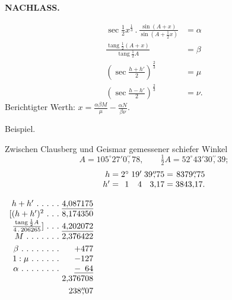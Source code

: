 \par\clearpage
\noindent{}\hfill{\small\textbf{NACHLASS.}}\hfill\null\par\medskip
\[
\begin{aligned}
\sec\tfrac12x^{\frac13}\,.\,\frac{\sin(A+x)}{\sin(A+\frac12x)}&=\alpha\\[4pt]
\frac{\operatorname{tang}\frac12(A+x)}{\operatorname{tang}\frac12A}&=\beta\\[4pt]
\left(\sec\frac{h+h'}2\right)^{\frac23}&=\mu\\[4pt]
\left(\sec\frac{h-h'}2\right)^{\frac23}&=\nu.
\end{aligned}
\]
\noindent Berichtigter Werth: $\displaystyle x=\frac{\alpha\beta M}{\mu}-\frac{\alpha N}{\beta\nu}$.
\begin{center}Beispiel.\end{center}
\noindent Zwischen Clausberg und Geismar gemessener schiefer Winkel
\[
A=105^\circ27'0\overset{\prime\prime}{,}78,\qquad
\tfrac12A=52^\circ43'30\overset{\prime\prime}{,}39;
\]
\[
\begin{array}{r@{\;}c@{\;}r@{\;}r@{\;}r@{\;}c@{\;}r}
h&=&2^\circ&19'&39\overset{\prime\prime}{,}75&=&8379\overset{\prime\prime}{,}75\\
h'&=&1&4&3{,}17&=&3843{,}17.
\end{array}
\]
\noindent\begin{minipage}[t]{.31\linewidth}\centering
$\begin{array}{r@{\ }r}
h+h'\ .\ .\ .\ .\ .&\underline{4{,}087175}\\
{[}(h+h')^2\ .\ .\ .&8{,}174350\\
\frac{\operatorname{tang}\frac12A}{4\,.\,206265}]\ .\ .\ .&\underline{4{,}202072}\\
M\ .\ .\ .\ .\ .\ .\ .&2{,}376422\\[3pt]
\beta\ .\ .\ .\ .\ .\ .\ .\ .&+477\\
1:\mu\ .\ .\ .\ .\ .\ .&-127\\
\alpha\ .\ .\ .\ .\ .\ .\ .\ .&\underline{-\phantom{1}64}\\
&2{,}376708\\[3pt]
&238\overset{\prime\prime}{,}07
\end{array}$
\end{minipage}\hfill
